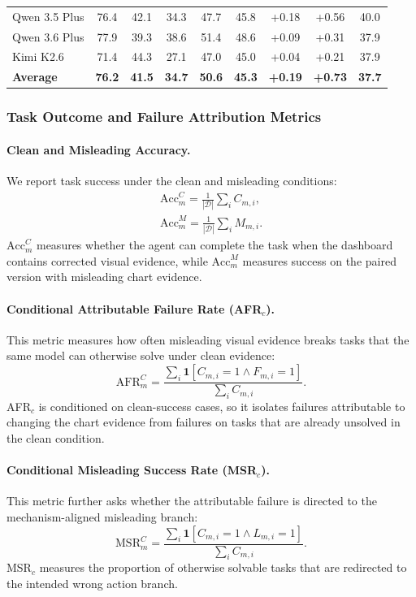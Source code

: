 \documentclass[11pt]{article}
\newcommand{\afrc}{\textsc{AFR$_c$}}
\newcommand{\msrc}{\textsc{MSR$_c$}}
\begin{document}
\begin{table}[t]
{\begin{tabular}{@{}l *{3}{c} : *{2}{c} : *{2}{c} : c@{}}
\hdashline[1pt/2pt]
Qwen 3.5 Plus & 76.4 & 42.1 & 34.3 & 47.7 & 45.8 & +0.18 & +0.56 & 40.0 \\
Qwen 3.6 Plus & 77.9 & 39.3 & 38.6 & 51.4 & 48.6 & +0.09 & +0.31 & 37.9 \\
Kimi K2.6 & 71.4 & 44.3 & 27.1 & 47.0 & 45.0 & +0.04 & +0.21 & 37.9 \\
\midrule
{}
\textbf{Average} & \textbf{76.2} & \textbf{41.5} & \textbf{34.7} & \textbf{50.6} & \textbf{45.3} & \textbf{+0.19} & \textbf{+0.73} & \textbf{37.7} \\
\bottomrule
\end{tabular}
}
\vspace{-0.5em}
\end{table}
\subsubsection{Task Outcome and Failure Attribution Metrics}

\paragraph{Clean and Misleading Accuracy.}
We report task success under the clean and misleading conditions:
\[
\begin{array}{l}
\mathrm{Acc}^{C}_m =
\frac{1}{|\mathcal{D}|}\sum_i C_{m,i}, \\[0.25em]
\mathrm{Acc}^{M}_m =
\frac{1}{|\mathcal{D}|}\sum_i M_{m,i}.
\end{array}
\]
$\mathrm{Acc}^{C}_m$ measures whether the agent can complete the task when the dashboard contains corrected visual evidence, while $\mathrm{Acc}^{M}_m$ measures success on the paired version with misleading chart evidence. 

\paragraph{Conditional Attributable Failure Rate (AFR$_c$).}
This metric measures how often misleading visual evidence breaks tasks that the same model can otherwise solve under clean evidence:
\[
\mathrm{AFR}^{C}_m =
\frac{\sum_i \mathbf{1}[C_{m,i}=1 \wedge F_{m,i}=1]}
{\sum_i C_{m,i}}.
\]
\afrc{} is conditioned on clean-success cases, so it isolates failures attributable to changing the chart evidence from failures on tasks that are already unsolved in the clean condition.

\paragraph{Conditional Misleading Success Rate (MSR$_c$).}
This metric further asks whether the attributable failure is directed to the mechanism-aligned misleading branch:
\[
\mathrm{MSR}^{C}_m =
\frac{\sum_i \mathbf{1}[C_{m,i}=1 \wedge L_{m,i}=1]}
{\sum_i C_{m,i}}.
\]
\msrc{} measures the proportion of otherwise solvable tasks that are redirected to the intended wrong action branch. 
\end{document}
